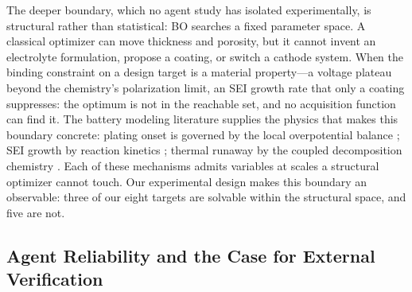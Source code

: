 The deeper boundary, which no agent study has isolated experimentally, is
structural rather than statistical: BO searches a fixed parameter space. A
classical optimizer can move thickness and porosity, but it cannot invent an
electrolyte formulation, propose a coating, or switch a cathode system. When
the binding constraint on a design target is a material property---a
voltage plateau beyond the chemistry's polarization limit, an SEI growth
rate that only a coating suppresses: the optimum is not in the reachable
set, and no acquisition function can find it. The battery modeling
literature supplies the physics that makes this boundary concrete: plating
onset is governed by the local overpotential balance
\cite{arora1999plating, ren2018plating}; SEI growth by reaction kinetics
\cite{peled1979sei}; thermal runaway by the coupled decomposition chemistry
\cite{wang2012thermalrunaway}. Each of these mechanisms admits variables at
scales a structural optimizer cannot touch. Our experimental design makes
this boundary an observable: three of our eight targets are solvable
within the structural space, and five are not.

\subsection{Agent Reliability and the Case for External Verification}

